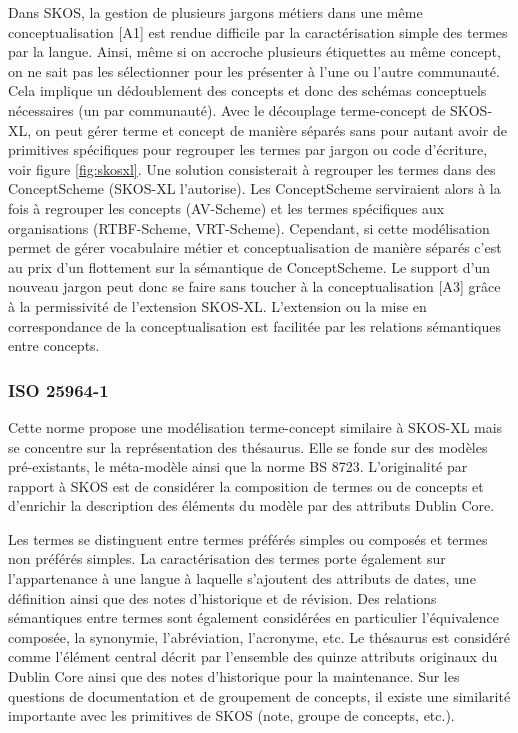 Dans SKOS, la gestion de plusieurs jargons métiers dans une même conceptualisation [A1] est rendue difficile par la caractérisation simple des termes par la langue. 
Ainsi, même si on accroche plusieurs étiquettes au même concept, on ne sait pas les sélectionner pour les présenter à l'une ou l'autre communauté. 
Cela implique un dédoublement des concepts et donc des schémas conceptuels nécessaires (un par communauté).%
Avec le découplage terme-concept de SKOS-XL, on peut gérer terme et concept de manière séparés sans pour autant avoir de primitives spécifiques pour regrouper les termes par jargon ou code d'écriture, voir figure \ref{fig:skosxl}. 
Une solution consisterait à regrouper les termes dans des ConceptScheme (SKOS-XL l'autorise).
Les ConceptScheme serviraient alors à la fois à regrouper les concepts (AV-Scheme) et les termes spécifiques aux organisations (RTBF-Scheme, VRT-Scheme). 
Cependant, si cette modélisation permet de gérer vocabulaire métier et conceptualisation de manière séparés c'est au prix d'un flottement sur la sémantique de ConceptScheme. 
Le support d'un nouveau jargon peut donc se faire sans toucher à la conceptualisation [A3] grâce à la permissivité de l'extension SKOS-XL. 
L'extension ou la mise en correspondance de la conceptualisation est facilitée par les relations sémantiques entre concepts.


\subsubsection{ISO 25964-1}
Cette norme propose une modélisation terme-concept similaire à SKOS-XL mais se concentre sur la représentation des thésaurus. 
Elle se fonde sur des modèles pré-existants, le méta-modèle \cite{Vandenbussche2009} ainsi que la norme BS 8723. 
L'originalité par rapport à SKOS est de considérer la composition de termes ou de concepts et d'enrichir la description des éléments du modèle par des attributs Dublin Core.

Les termes se distinguent entre termes préférés simples ou composés et termes non préférés simples. 
La caractérisation des termes porte également sur l'appartenance à une langue à laquelle s'ajoutent des attributs de dates, une définition ainsi que des notes d'historique et de révision. 
Des relations sémantiques entre termes sont également considérées en particulier l'équivalence composée, la synonymie, l'abréviation, l'acronyme, etc. 
Le thésaurus est considéré comme l'élément central décrit par l'ensemble des quinze attributs originaux du Dublin Core ainsi que des notes d'historique pour la maintenance. 
Sur les questions de documentation et de groupement de concepts, il existe une similarité importante avec les primitives de SKOS (note, groupe de concepts, etc.).\\

